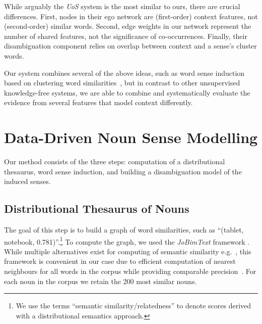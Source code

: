 \documentclass[11pt]{article}
\begin{document}
While arguably the \emph{UoS} system is the most similar to ours, there are  crucial  differences. First, nodes in their ego network are (first-order) context features, not (second-order) similar words. Second, edge weights in our network represent the number of shared features, not the significance of co-occurrences. Finally, their disambiguation component relies on overlap between context and a sense's cluster words. 


Our system combines several of the above ideas, such as word sense induction based on clustering word similarities~\cite{pantel2002}, but in contrast to other unsupervised knowledge-free systems, we are able to combine and systematically evaluate the evidence from several features that model context differently.

\section{Data-Driven Noun Sense Modelling}

Our method consists of the three steps: computation of a distributional thesaurus, word sense induction, and building a disambiguation model of the induced senses. %

\subsection{Distributional Thesaurus of Nouns}
\label{sec:dt-computation}

The goal of this step is to build a graph of word similarities, such as ``(tablet, notebook, 0.781)''.\footnote{We use the terms ``semantic similarity/relatedness'' to denote  scores derived with a distributional semantics approach. } To compute the graph, we used the \emph{JoBimText} framework \cite{Biemann2013}. While multiple alternatives exist  for computing of semantic similarity e.g.~\cite{mikolov2013efficient}, this framework is convenient in our case due to efficient computation of nearest neighbours for all words in the corpus while providing comparable precision~\cite{riedl2016phd}. For each noun in the corpus we retain the 200 most similar nouns. 
\end{document}
